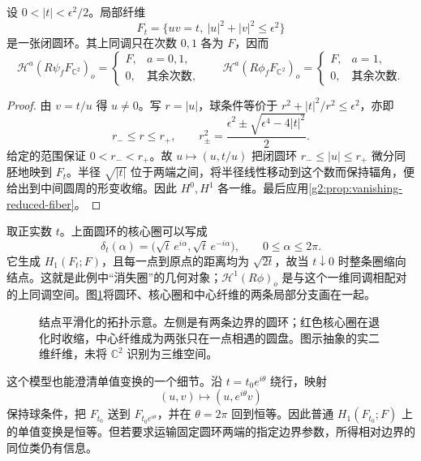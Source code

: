 \begin{proposition}\label{g2:prop:nodal-milnor-annulus}
	设 \(0<|t|<\epsilon^2/2\)。局部纤维
	\[
		F_t=\{uv=t,\ |u|^2+|v|^2\leq\epsilon^2\}
	\]
	是一张闭圆环。其上同调只在次数 \(0,1\) 各为 \(F\)，因而
	\[
		\mathcal H^a(R\psi_fF_{\mathbb C^2})_o=
		\begin{cases}F,&a=0,1,\\0,&\text{其余次数},\end{cases}
		\qquad
		\mathcal H^a(R\phi_fF_{\mathbb C^2})_o=
		\begin{cases}F,&a=1,\\0,&\text{其余次数}.\end{cases}
	\]
\end{proposition}
\begin{proof}
	由 \(v=t/u\) 得 \(u\ne0\)。写 \(r=|u|\)，球条件等价于 \(r^2+|t|^2/r^2\leq\epsilon^2\)，亦即
	\[
		r_-\leq r\leq r_+,\qquad
		r_\pm^2=\frac{\epsilon^2\pm\sqrt{\epsilon^4-4|t|^2}}2.
	\]
	给定的范围保证 \(0<r_-<r_+\)。故 \(u\mapsto(u,t/u)\) 把闭圆环 \(r_-\leq|u|\leq r_+\) 微分同胚地映到 \(F_t\)。半径 \(\sqrt{|t|}\) 位于两端之间，将半径线性移动到这个数而保持辐角，便给出到中间圆周的形变收缩。因此 \(H^0,H^1\) 各一维。最后应用\cref{g2:prop:vanishing-reduced-fiber}。
\end{proof}

取正实数 \(t\)。上面圆环的核心圈可以写成
\begin{equation}\label{g2:eq:node-vanishing-circle}
	\delta_t(\alpha)=\bigl(\sqrt t\,e^{i\alpha},\sqrt t\,e^{-i\alpha}\bigr),
	\qquad 0\leq\alpha\leq2\pi.
\end{equation}
它生成 \(H_1(F_t;F)\)，且每一点到原点的距离均为 \(\sqrt{2t}\)，故当 \(t\downarrow0\) 时整条圈缩向结点。这就是此例中“消失圈”的几何对象；\(\mathcal H^1(R\phi)_o\) 是与这个一维同调相配对的上同调空间。图\ref{g2:fig:node-degeneration}将圆环、核心圈和中心纤维的两条局部分支画在一起。

\begin{figure}[htbp]
	\centering
	
	\caption{结点平滑化的拓扑示意。左侧是有两条边界的圆环；红色核心圈在退化时收缩，中心纤维成为两张只在一点相遇的圆盘。图示抽象的实二维纤维，未将 \(\mathbb C^2\) 识别为三维空间。}
	\label{g2:fig:node-degeneration}
\end{figure}

这个模型也能澄清单值变换的一个细节。沿 \(t=t_0e^{i\theta}\) 绕行，映射
\[
	(u,v)\longmapsto(u,e^{i\theta}v)
\]
保持球条件，把 \(F_{t_0}\) 送到 \(F_{t_0e^{i\theta}}\)，并在 \(\theta=2\pi\) 回到恒等。因此普通 \(H_1(F_{t_0};F)\) 上的单值变换是恒等。但若要求运输固定圆环两端的指定边界参数，所得相对边界的同位类仍有信息。

